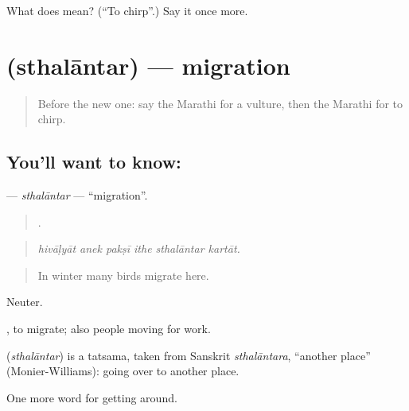 \begin{tcolorbox}[breakable,colback=teal!4,colframe=teal!35!black,title={Before you move on}]
What does  mean? (\textquotedblleft{}To chirp\textquotedblright{}.) Say it once more.
\end{tcolorbox}
\section[\texorpdfstring{\mr{स्थलांतर} (sthalāntar)}{स्थलांतर (sthalāntar)}]{ (sthalāntar) — migration}

\label{lesson:MR-C447-sthalantar}



\begin{quote}
Before the new one: say the Marathi for a vulture, then the Marathi for to chirp.
\end{quote}

\subsection*{You'll want to know: }
\textbf{} — \emph{sthalāntar} — \textquotedblleft{}migration\textquotedblright{}.

\begin{quote}
     .
\end{quote}

\begin{quote}
\emph{hivāḷyāt anek pakṣī ithe sthalāntar kartāt.}
\end{quote}

\begin{quote}
In winter many birds migrate here.
\end{quote}

Neuter.

 , to migrate; also people moving for work.

\begin{cousinweb}
\textbf{} (\emph{sthalāntar}) is a tatsama, taken from Sanskrit \emph{sthalāntara}, \textquotedblleft{}another place\textquotedblright{} (Monier-Williams): going over to another place.
\end{cousinweb}

\begin{grammarlens}[title={What you've built}]
One more word for getting around.
\end{grammarlens}

